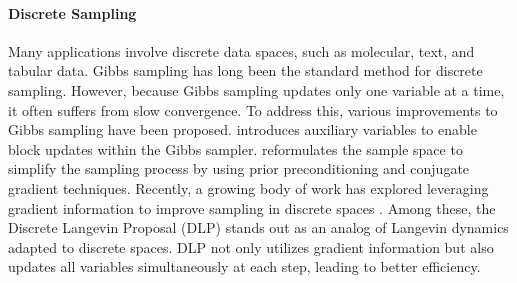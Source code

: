 \paragraph{Discrete Sampling}
Many applications involve discrete data spaces, such as molecular, text, and tabular data. Gibbs sampling has long been the standard method for discrete sampling. However, because Gibbs sampling updates only one variable at a time, it often suffers from slow convergence. To address this, various improvements to Gibbs sampling have been proposed. \citet{titsias2017hamming} introduces auxiliary variables to enable block updates within the Gibbs sampler. \citet{nishimura2023prior} reformulates the sample space to simplify the sampling process by using prior preconditioning and conjugate gradient techniques.
Recently, a growing body of work has explored leveraging gradient information to improve sampling in discrete spaces \citep{grathwohl2021gwg, sun2022optimal, pynadath2024gradientbaseddiscretesamplingautomatic}. Among these, the Discrete Langevin Proposal (DLP) \cite{zhang2022langevin} stands out as an analog of Langevin dynamics adapted to discrete spaces. DLP not only utilizes gradient information but also updates all variables simultaneously at each step, leading to better efficiency.